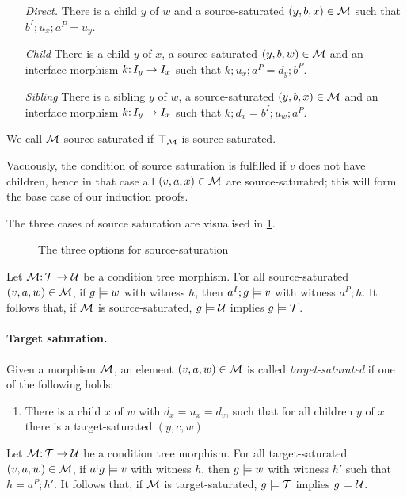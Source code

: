 \begin{enumerate}[label=(\alph*)]
\item[\emph{Direct.}] There is a child $y$ of $w$ and a source-saturated $(y,b,x)\in{\mathcal{M}}$ such that $b^I;u_x;a^P=u_y$.
\item[\emph{Child}] There is a child $y$ of $x$, a source-saturated $(y,b,w)\in{\mathcal{M}}$ and an interface morphism $k{:}\, I_y\rightarrow I_x$ such that $k;u_x;a^P=d_y;b^P$.
\item[\emph{Sibling}] There is a sibling $y$ of $w$, a source-saturated $(y,b,x)\in{\mathcal{M}}$ and an interface morphism $k{:}\, I_y\rightarrow I_x$ such that $k;d_x=b^I;u_w;a^P$.
\end{enumerate}
%
We call ${\mathcal{M}}$ source-saturated if $\top_{{\mathcal{M}}}$ is source-saturated.

Vacuously, the condition of source saturation is fulfilled if $v$ does not have children, hence in that case all $(v,a,x)\in {\mathcal{M}}$ are source-saturated; this will form the base case of our induction proofs.

The three cases of source saturation are visualised in \cref{fig:source-saturation}.

\begin{figure}

\caption{The three options for source-saturation}
\label{fig:source-saturation}
\end{figure}

\begin{lemma}\label{lem:source-saturation}
Let ${\mathcal{M}}{:}\,{\mathcal{T}}\rightarrow{\mathcal{U}}$ be a condition tree morphism. For all source-saturated $(v,a,w)\in {\mathcal{M}}$, if $g\models w$ with witness $h$, then $a^I;g\models v$ with witness $a^P;h$. It follows that, if ${\mathcal{M}}$ is source-saturated, $g\models{\mathcal{U}}$ implies $g\models{\mathcal{T}}$.
\end{lemma}

\paragraph{Target saturation.}

Given a morphism ${\mathcal{M}}$, an element $(v,a,w)\in {\mathcal{M}}$ is called \emph{target-saturated} if one of the following holds:

\begin{enumerate}[label=(\alph*)]
\item There is a child $x$ of $w$ with $d_x=u_x=d_v$, such that for all children $y$ of $x$ there is a target-saturated $(y,c,w)$
\end{enumerate}

\begin{lemma}
Let ${\mathcal{M}}{:}\,{\mathcal{T}}\rightarrow{\mathcal{U}}$ be a condition tree morphism. For all target-saturated $(v,a,w)\in {\mathcal{M}}$, if $a^;g\models v$ with witness $h$, then $g\models w$ with witness $h'$ such that $h=a^P;h'$. It follows that, if ${\mathcal{M}}$ is target-saturated, $g\models{\mathcal{T}}$ implies $g\models{\mathcal{U}}$.
\end{lemma}

